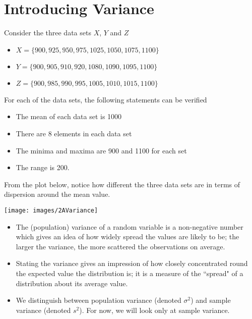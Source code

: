 \documentclass[a4paper,12pt]{article}
\begin{document}
	


\section*{Introducing Variance}

Consider the three data sets $X$, $Y$ and $Z$
\begin{itemize}
	\item $X= \{900,925,950,975,1025,1050,1075,1100 \}$
	\item $Y=\{900,905,910,920,1080,1090,1095,1100\}$
	\item $Z=\{900,985,990,995,1005,1010,1015,1100\}$
\end{itemize}

\begin{framed}
\noindent For each of the data sets, the following statements can be verified

\begin{itemize}
	\item The mean of each data set is 1000
	\item There are 8 elements in each data set
	\item The minima and maxima are 900 and 1100 for each set
	\item The range is 200.
\end{itemize}
\end{framed}
\noindent From the plot below, notice how different the three data sets are in terms of dispersion around the mean value.





\begin{center}
	\texttt{[image: images/2AVariance]}
\end{center}

	
	
	\begin{itemize}
		
		\item The (population) variance of a random variable is a non-negative number which gives an idea of how widely spread the values are likely to be; the larger the variance, the more scattered the observations on average.
		
		\item Stating the variance gives an impression of how closely concentrated round the expected value the distribution is; it is a measure of the ``spread" of a distribution about its average value.
		
		
		\item We distinguish between population variance (denoted $\sigma^2$) and sample variance (denoted $s^2$). For now, we will look only at sample variance.
		
		
	\end{itemize}
\end{document}
